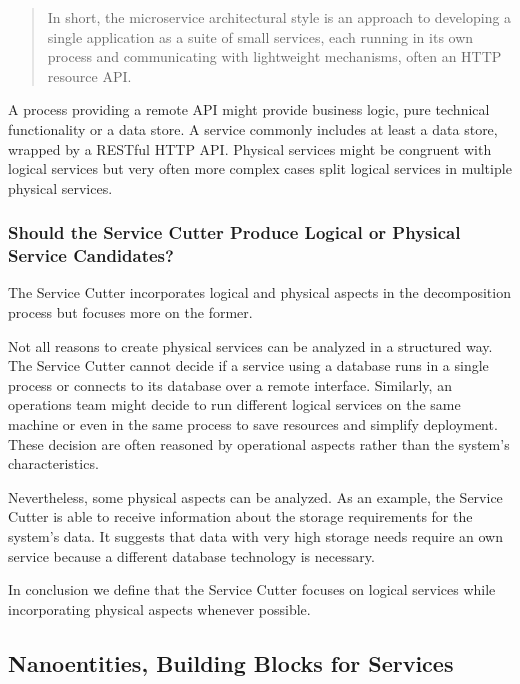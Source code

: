 \begin{quotation}
	In short, the microservice architectural style is an approach to developing a single application as a suite of small services, each running in its own process and communicating with lightweight mechanisms, often an HTTP resource API.\cite{fowlerMicroservice}
\end{quotation}

A process providing a remote API might provide business logic, pure technical functionality or a data store. A service commonly includes at least a data store, wrapped by a RESTful HTTP API. Physical services might be congruent with logical services but very often more complex cases split logical services in multiple physical services. 

\subsubsection{Should the Service Cutter Produce Logical or Physical Service Candidates?}

The Service Cutter incorporates logical and physical aspects in the decomposition process but focuses more on the former. 

Not all reasons to create physical services can be analyzed in a structured way. The Service Cutter cannot decide if a service using a database runs in a single process or connects to its database over a remote interface. Similarly, an operations team might decide to run different logical services on the same machine or even in the same process to save resources and simplify deployment. These decision are often reasoned by operational aspects rather than the system's characteristics. 

Nevertheless, some physical aspects can be analyzed. As an example, the Service Cutter is able to receive information about the storage requirements for the system's data. It suggests that data with very high storage needs require an own service because a different database technology is necessary. 

In conclusion we define that the Service Cutter focuses on logical services while incorporating physical aspects whenever possible. 


\subsection{Nanoentities, Building Blocks for Services}

